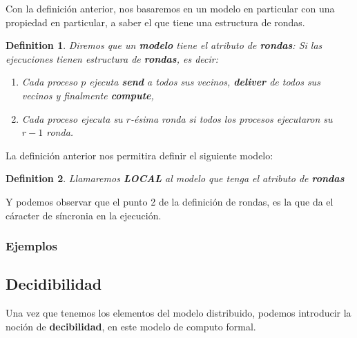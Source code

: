 \documentclass[10pt]{report}
\newtheorem{definition}{Definition}
\begin{document}
    Con la definición anterior, nos basaremos en un modelo en particular con una propiedad en particular, a saber el que
    tiene una estructura de rondas.\newline
    \begin{definition}
        Diremos que un \textbf{modelo} tiene el atributo de \textbf{rondas}:
        Si las ejecuciones tienen estructura de \textbf{rondas}, es decir:
        \begin{enumerate}
            \item Cada proceso $p$ ejecuta \textbf{send} a todos sus vecinos, \textbf{deliver} de todos sus vecinos y finalmente \textbf{compute},
            \item Cada proceso ejecuta su $r$-ésima ronda si todos los procesos ejecutaron su $r-1$ ronda.
        \end{enumerate}
    \end{definition}\newline
    La definición anterior nos permitira definir el siguiente modelo:
    \begin{definition}
        Llamaremos \textbf{LOCAL} al modelo que tenga el atributo de \textbf{rondas}
    \end{definition}
    Y podemos observar que el punto 2 de la definición de rondas, es la que da el cáracter de
    síncronia en la ejecución.
    \subsubsection{Ejemplos}


    \newpage
    \subsection{Decidibilidad}\label{subsec:decidibilidad}
    Una vez que tenemos los elementos del modelo distribuido, podemos introducir la noción de \textbf{decibilidad}, en
    este modelo de computo formal.
\end{document}
